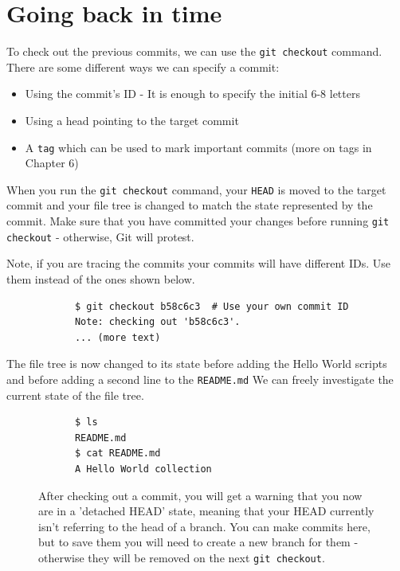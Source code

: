 \documentclass[../main/git_course_main.tex]{subfiles}
\begin{document}
	\section{Going back in time}
	
	To check out the previous commits, we can use the \verb$git checkout$ command. There are some different ways we can specify a commit:
	
	\begin{itemize}
		\item Using the commit's ID - It is enough to specify the initial 6-8 letters
		\item Using a head pointing to the target commit
		\item A \verb$tag$ which can be used to mark important commits (more on tags in Chapter 6)
	\end{itemize}
	
	When you run the \verb$git checkout$ command, your \verb$HEAD$ is moved to the target commit and your file tree is changed to match the state represented by the commit. Make sure that you have committed your changes before running \verb$git checkout$ - otherwise, Git will protest.
	
	Note, if you are tracing the commits your commits will have different IDs. Use them instead of the ones shown below.
	
	\begin{codebox}
		\begin{lstlisting}
			$ git checkout b58c6c3  # Use your own commit ID
			Note: checking out 'b58c6c3'.
			... (more text)
		\end{lstlisting}
	\end{codebox}
	
	The file tree is now changed to its state before adding the Hello World scripts and before adding a second line to the \verb$README.md$ We can freely investigate the current state of the file tree.
	
	\begin{codebox}
		\begin{lstlisting}
			$ ls
			README.md
			$ cat README.md
			A Hello World collection
		\end{lstlisting}
	\end{codebox}
	
	\begin{figure}[h!]
		\begin{redbox}
			After checking out a commit, you will get a warning that you now are in a 'detached HEAD' state, meaning that your HEAD currently isn't referring to the head of a branch.
			You can make commits here, but to save them you will need to create a new branch for them - otherwise
			they will be removed on the next \verb$git checkout$.
		\end{redbox}
	\end{figure}
	
\end{document}
